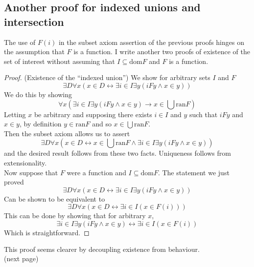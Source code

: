 \documentclass{report}
\begin{document}
\subsection{Another proof for indexed unions and intersection}
The use of $F(i)$ in the subset axiom assertion of the previous proofs hinges on the assumption that $F$ is a function. I write another two proofs of existence of the set of interest without
assuming that $I\subseteq\text{dom}F$ and $F$ is a function.
\begin{proof}(Existence of the ``indexed union'')
We show for arbitrary sets $I$ and $F$
\begin{equation*}
\exists D\forall x(x\in D\leftrightarrow\exists i\in I\exists y(iFy\land x\in y))
\end{equation*}
We do this by showing
\begin{equation*}
\forall x(\exists i\in I\exists y(iFy\land x\in y)\to x\in\bigcup\text{ran}F)
\end{equation*}
Letting $x$ be arbitrary and supposing there exists $i\in I$ and $y$ such that $iFy$ and $x\in y$,
by definition $y\in\text{ran}F$ and so $x\in\bigcup\text{ran}F$.\\
\indent Then the subset axiom allows us to assert
\begin{equation*}
\exists D\forall x(x\in D\leftrightarrow x\in\bigcup\text{ran}F\land\exists i\in I\exists y(iFy\land x\in y))
\end{equation*}
and the desired result follows from these two facts. Uniqueness follows from extensionality.\\
\indent Now suppose that $F$ were a function and $I\subseteq\text{dom}F$. The statement we just proved
\begin{equation*}
\exists D\forall x(x\in D\leftrightarrow\exists i\in I\exists y(iFy\land x\in y))
\end{equation*}
Can be shown to be equivalent to
\begin{equation*}
\exists D\forall x(x\in D\leftrightarrow\exists i\in I(x\in F(i)))
\end{equation*}
This can be done by showing that for arbitrary $x$,
\begin{equation*}
\exists i\in I\exists y(iFy\land x\in y)\leftrightarrow\exists i\in I(x\in F(i))
\end{equation*}
Which is straightforward.
\end{proof}
\noindent This proof seems clearer by decoupling existence from behaviour.\\
(next page)\newpage
\end{document}
